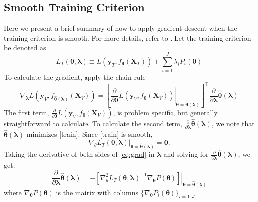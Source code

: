 \documentclass[12pt]{article}
\begin{document}
\subsection{Smooth Training Criterion}
Here we present a brief summary of how to apply gradient descent when the training criterion is smooth. For more details, refer to \citet{bengio2000gradient}. Let the training criterion be denoted as
\begin{equation}
L_T\left(\boldsymbol \theta, \boldsymbol{\lambda}\right) \equiv L(\boldsymbol{y}_T, f_{\boldsymbol \theta} (\boldsymbol{X}_T)) + \sum\limits_{i=1}^J \lambda_i P_i(\boldsymbol \theta)
\label{train}
\end{equation}
To calculate the gradient, apply the chain rule
\begin{equation}
\nabla_{\boldsymbol{\lambda}} L \left( \boldsymbol{y}_V, f_{\hat{\boldsymbol \theta}(\boldsymbol{\lambda})}(\boldsymbol{X}_V) \right ) = 
\left [
\left . \frac{\partial}{\partial \boldsymbol \theta} L ( \boldsymbol{y}_V, f_{\boldsymbol \theta}(\boldsymbol{X}_V)) \right |_{\boldsymbol \theta=\hat{\boldsymbol \theta}(\boldsymbol \lambda)}
\right ]^\top 
\frac{\partial}{\partial \boldsymbol{\lambda}} \hat{\boldsymbol \theta}(\boldsymbol{\lambda})
\label{chainrule}
\end{equation}
The first term, $\frac{\partial}{\partial \boldsymbol \theta} L ( \boldsymbol{y}_V, f_{\boldsymbol \theta}(\boldsymbol{X}_V))$, is problem specific, but generally straightforward to calculate. To calculate the second term, $\frac{\partial}{\partial \boldsymbol{\lambda}} \hat{\boldsymbol \theta}(\boldsymbol{\lambda})$, we note that $\hat{\boldsymbol \theta}(\boldsymbol{\lambda})$ minimizes \eqref{train}. Since \eqref{train} is smooth,
\begin{equation}
\nabla_\theta 
L_T(\boldsymbol \theta, \boldsymbol{\lambda})
|_{\boldsymbol \theta = \hat {\boldsymbol \theta}(\boldsymbol{\lambda})}
= \boldsymbol{0}.
\label{eq:grad}
\end{equation}
Taking the derivative of both sides of \eqref{eq:grad} in $\boldsymbol{\lambda}$ and solving for $\frac{\partial}{\partial \boldsymbol{\lambda}} \hat{\boldsymbol \theta}(\boldsymbol{\lambda})$, we get:
\begin{equation}
\frac{\partial}{\partial \boldsymbol{\lambda}} \hat{\boldsymbol \theta}(\boldsymbol{\lambda}) = 
- \left . \left [
 \nabla_\theta^2 L_T (\boldsymbol \theta, \boldsymbol{\lambda} )^{-1}
\nabla_{\boldsymbol \theta} P(\boldsymbol \theta)
\right ]
\right |_{\boldsymbol \theta = \hat {\boldsymbol \theta}(\boldsymbol{\lambda})}
\label{implicitDifferentiation}
\end{equation}
where $\nabla_{\boldsymbol \theta} P(\boldsymbol \theta)$ is the matrix with columns $\{\nabla_{\boldsymbol \theta} P_i(\boldsymbol \theta)\}_{i=1:J}$.
\end{document}

